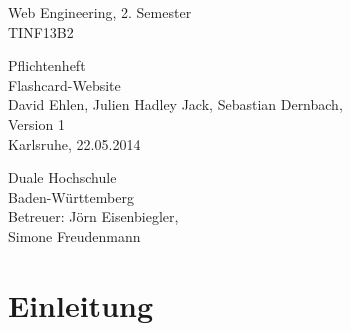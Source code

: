 \documentclass{article}
\newcommand{\appname}{Flashcard-Website}
\begin{document}
\begin{titlepage}
    \large
    \begin{flushleft}
        Web Engineering, 2. Semester \\
        TINF13B2
    \end{flushleft}
    
    \vfill

    \begin{center}
        \Huge Pflichtenheft\\
        \Large \appname \\
        \vspace{1cm}
        \normalsize David Ehlen, Julien Hadley Jack, Sebastian Dernbach, \\
        \vspace\medskipamount
        \vspace\medskipamount
        Version 1\\
        Karlsruhe, 22.05.2014
    \end{center}
    
    \vfill
    
    \begin{flushright}
        Duale Hochschule \\
        Baden-Württemberg \\
        \vspace\medskipamount
        Betreuer: Jörn Eisenbiegler,\\
        Simone Freudenmann
    \end{flushright}
\end{titlepage}

\newpage

\pagestyle{empty}
\tableofcontents
\cleardoublepage

\setcounter{page}{1}
\pagestyle{plain}
\setcounter{page}{1}

\section{Einleitung}







\end{document}

